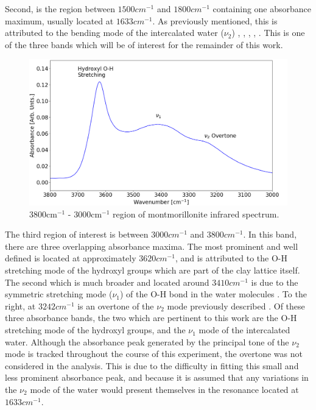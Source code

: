 Second, is the region between $1500cm^{-1}$ and $1800cm^{-1}$ containing one absorbance maximum, usually located at $1633cm^{-1}$. As previously mentioned, this is attributed to the bending mode of the intercalated water ($\nu_2$) \cite{madejova2003ftir}, \cite{madejova2001baseline}, \cite{bishop1994infrared}, \cite{johnston1992vibrational}, \cite{xu2000infrared}. This is one of the three bands which will be of interest for the remainder of this work.

\begin{figure}
	\centering
	\includegraphics[scale=0.5]{images/water_peaks.png}
	\caption{3800cm$^{-1}$ - 3000cm$^{-1}$ region of montmorillonite infrared spectrum.}
	\label{fig:water_peaks}
\end{figure}

The third region of interest is between $3000cm^{-1}$ and $3800cm^{-1}$. In this band, there are three overlapping absorbance maxima. The most prominent and well defined is located at approximately $3620cm^{-1}$, and is attributed to the O-H stretching mode of the hydroxyl groups which are part of the clay lattice itself. The second which is much broader and located around $3410cm^{-1}$ is due to the symmetric stretching mode ($\nu_1$) of the O-H bond in the water molecules \cite{madejova2001baseline}. To the right, at $3242cm^{-1}$ is an overtone of the $\nu_2$ mode previously described \cite{xu2000infrared}. Of these three absorbance bands, the two which are pertinent to this work are the O-H stretching mode of the hydroxyl groups, and the $\nu_1$ mode of the intercalated water. Although the absorbance peak generated by the principal tone of the $\nu_2$ mode is tracked throughout the course of this experiment, the overtone was not considered in the analysis. This is due to the difficulty in fitting this small and less prominent absorbance peak, and because it is assumed that any variations in the $\nu_2$ mode of the water would present themselves in the resonance located at $1633cm^{-1}$.

